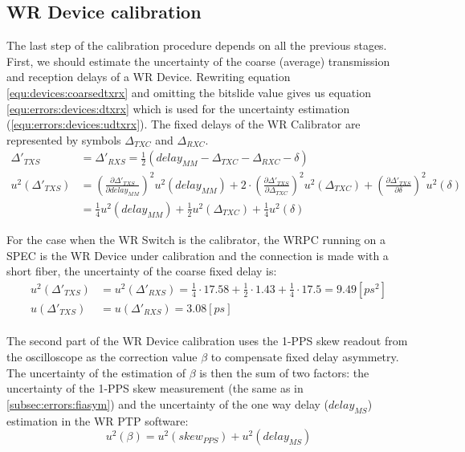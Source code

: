 \subsection{WR Device calibration}
The last step of the calibration procedure depends on all the previous stages.
First, we should estimate the uncertainty of the coarse (average) transmission
and reception delays of a WR Device. Rewriting equation
\ref{equ:devices:coarsedtxrx} and omitting the bitslide value gives us equation
\ref{equ:errors:devices:dtxrx} which is used for the uncertainty
estimation (\ref{equ:errors:devices:udtxrx}). The fixed delays of the WR
Calibrator are represented by symbols $\Delta_{TXC}$ and $\Delta_{RXC}$.
\begin{align}
	\label{equ:errors:devices:dtxrx}
	\Delta'_{TXS} &= \Delta'_{RXS} = \frac{1}{2}(delay_{MM} - \Delta_{TXC} -
	\Delta_{RXC} - \delta)\\
	\label{equ:errors:devices:udtxrx}
	u^2(\Delta'_{TXS}) &= \left( \frac{\partial \Delta'_{TXS}}{\partial delay_{MM}} \right)^2 u^2(delay_{MM}) +
	2 \cdot \left( \frac{\partial \Delta'_{TXS}}{\partial \Delta_{TXC}} \right)^2 u^2(\Delta_{TXC}) +
	\left( \frac{\partial \Delta'_{TXS}}{\partial \delta} \right)^2 u^2(\delta) \nonumber\\
	&= \frac{1}{4} u^2(delay_{MM}) + \frac{1}{2} u^2(\Delta_{TXC}) + \frac{1}{4} u^2(\delta)
\end{align}

For the case when the WR Switch is the calibrator, the WRPC running on a SPEC is
the WR Device under calibration and the connection is made with a short fiber,
the uncertainty of the coarse fixed delay is:
\begin{align}
	u^2(\Delta'_{TXS}) &= u^2(\Delta'_{RXS}) = \frac{1}{4} \cdot 17.58 +
  \frac{1}{2} \cdot 1.43 + \frac{1}{4} \cdot 17.5 = 9.49 [ps^2]\\
	u(\Delta'_{TXS}) &= u(\Delta'_{RXS}) = 3.08 [ps]
\end{align}\\

The second part of the WR Device calibration uses the 1-PPS skew readout from
the oscilloscope as the correction value $\beta$ to compensate fixed delay
asymmetry. The uncertainty of the estimation of $\beta$ is then the sum of two
factors: the uncertainty of the 1-PPS skew measurement (the same as in
\ref{subsec:errors:fiasym}) and the uncertainty of the one way delay
($delay_{MS}$) estimation in the WR PTP software:
\begin{equation}
	\label{equ:errors:ubeta}
	u^2(\beta) = u^2(skew_{PPS}) + u^2(delay_{MS})
\end{equation}

